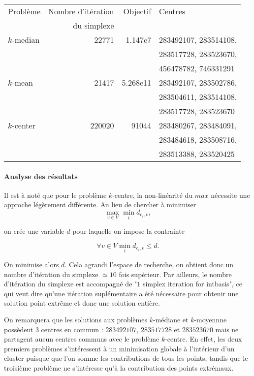 \documentclass[12pt,a4paper]{article}
\begin{document}
\begin{center}
  \begin{tabular}{ l r r l }
    \hline
    Problème & Nombre d'itération & Objectif & Centres  \\ 
    & du simplexe & & \\ \hline \hline
    $k$-median & 22771 & 1.147e7 & 283492107, 283514108, \\
    	& & & 283517728, 283523670, \\
    	& & & 456478782, 746331291 \\ \hline
    $k$-mean & 21417 & 5.268e11 & 283492107, 283502786, \\
    	& & & 283504611, 283514108, \\
    	& & & 283517728, 283523670 \\ \hline
    $k$-center & 220020 & 91044 & 283480267, 283484091, \\
    	& & &  283484618, 283508716, \\
    	& & & 283513388, 283520425\\
    \hline
  \end{tabular}
\end{center}
 
\paragraph{Analyse des résultats}

Il est à noté que pour le problème $k$-centre, la non-linéarité du $max$ nécessite une approche légèrement différente. Au lieu de chercher à minimiser 
\[ \max_{v \in V} \min_i d_{c_i,v}, \] 

\noindent on crée une variable $d$ pour laquelle on impose la contrainte

\[ \forall v \in V \min_i d_{c_i,v} \leq d. \] 

On minimise alors $d$. Cela agrandi l'espace de recherche, on obtient donc un nombre d'itération du simplexe $\simeq 10$ fois supérieur. Par ailleurs, le nombre d'itération du simplexe est accompagné de "$1$ simplex iteration for intbasis", ce qui veut dire qu'une itération suplémentaire a été nécessaire pour obtenir une solution point extrême et donc une solution entière.

\bigskip

On remarquera que les solutions aux problèmes $k$-médiane et $k$-moyennne possèdent $3$ centres en commun : $283492107$, $283517728$ et $283523670$ mais ne partagent aucun centres communs avec le problème $k$-centre. En effet, les deux premiers problèmes s'intéressent à un minimisation globale à l'intérieur d'un cluster puisque que l'on somme les contributions de tous les points, tandis que le troisième problème ne s'intéresse qu'à la contribution des points extrémaux.  
\end{document}

